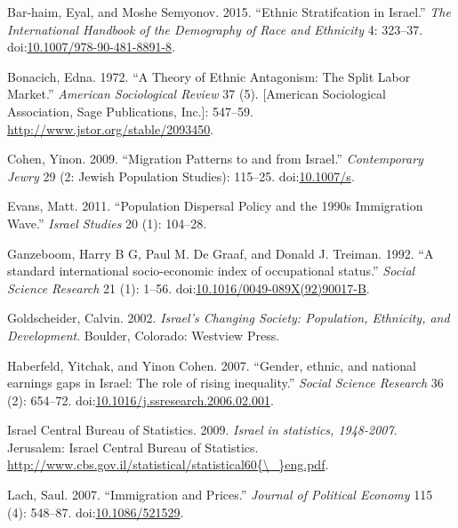 \documentclass[12pt,twoside]{reedthesis}
\begin{document}
  \hypertarget{refs}{}
  \hypertarget{ref-Bar-Chaim2015}{}
  Bar-haim, Eyal, and Moshe Semyonov. 2015. ``Ethnic Stratifcation in
  Israel.'' \emph{The International Handbook of the Demography of Race and
  Ethnicity} 4: 323--37.
  doi:\href{https://doi.org/10.1007/978-90-481-8891-8}{10.1007/978-90-481-8891-8}.
  
  \hypertarget{ref-Bonacich1972}{}
  Bonacich, Edna. 1972. ``A Theory of Ethnic Antagonism: The Split Labor
  Market.'' \emph{American Sociological Review} 37 (5). {[}American
  Sociological Association, Sage Publications, Inc.{]}: 547--59.
  \url{http://www.jstor.org/stable/2093450}.
  
  \hypertarget{ref-cohen2009}{}
  Cohen, Yinon. 2009. ``Migration Patterns to and from Israel.''
  \emph{Contemporary Jewry} 29 (2: Jewish Population Studies): 115--25.
  doi:\href{https://doi.org/10.1007/s}{10.1007/s}.
  
  \hypertarget{ref-Over2015}{}
  Evans, Matt. 2011. ``Population Dispersal Policy and the 1990s
  Immigration Wave.'' \emph{Israel Studies} 20 (1): 104--28.
  
  \hypertarget{ref-Ganzeboom1992}{}
  Ganzeboom, Harry B G, Paul M. De Graaf, and Donald J. Treiman. 1992. ``A
  standard international socio-economic index of occupational status.''
  \emph{Social Science Research} 21 (1): 1--56.
  doi:\href{https://doi.org/10.1016/0049-089X(92)90017-B}{10.1016/0049-089X(92)90017-B}.
  
  \hypertarget{ref-goldscheider2001israel}{}
  Goldscheider, Calvin. 2002. \emph{Israel's Changing Society: Population,
  Ethnicity, and Development}. Boulder, Colorado: Westview Press.
  
  \hypertarget{ref-Haberfeld2007}{}
  Haberfeld, Yitchak, and Yinon Cohen. 2007. ``Gender, ethnic, and
  national earnings gaps in Israel: The role of rising inequality.''
  \emph{Social Science Research} 36 (2): 654--72.
  doi:\href{https://doi.org/10.1016/j.ssresearch.2006.02.001}{10.1016/j.ssresearch.2006.02.001}.
  
  \hypertarget{ref-Israel2008}{}
  Israel Central Bureau of Statistics. 2009. \emph{Israel in statistics,
  1948-2007}. Jerusalem: Israel Central Bureau of Statistics.
  \href{http://www.cbs.gov.il/statistical/statistical60\%7B/_\%7Deng.pdf}{http://www.cbs.gov.il/statistical/statistical60\{\textbackslash{}\_\}eng.pdf}.
  
  \hypertarget{ref-Lach2007}{}
  Lach, Saul. 2007. ``Immigration and Prices.'' \emph{Journal of Political
  Economy} 115 (4): 548--87.
  doi:\href{https://doi.org/10.1086/521529}{10.1086/521529}.
  
\end{document}
